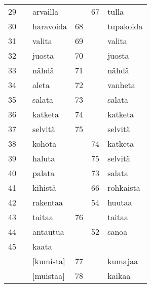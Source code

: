 \begin{longtable}{@{}rrlrrl}
29 & & arvailla  &    & 67 & tulla \\
30 & & haravoida & 68 &    & tupakoida \\
31 & & valita    & 69 &    & valita \\
32 & & juosta    & 70 &    & juosta \\
33 & & nähdä     & 71 &    & nähdä \\
34 & & aleta     & 72 &    & vanheta \\
35 & & salata    & 73 &    & salata \\
36 & & katketa   & 74 &    & katketa \\
37 & & selvitä   & 75 &    & selvitä \\
38 & & kohota    &    & 74 & katketa \\
39 & & haluta    &    & 75 & selvitä \\
40 & & palata    &    & 73 & salata \\
41 & & kihistä   &    & 66 & rohkaista \\
42 & & rakentaa  &    & 54 & huutaa \\
43 & & taitaa    & 76 &    & taitaa \\
44 & & antautua  &    & 52 & sanoa \\
45 & & kaata     &    &    &  \\
   & & [kumista] & 77 &    & kumajaa \\
   & & [muistaa] & 78 &    & kaikaa          
\end{longtable}
